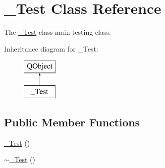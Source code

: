 \hypertarget{class__Test}{}\section{\+\_\+\+Test Class Reference}
\label{class__Test}


The \mbox{\hyperlink{class__Test}{\+\_\+\+Test}} class main testing class.  


Inheritance diagram for \+\_\+\+Test\+:\begin{figure}[H]
\begin{center}
\leavevmode
\includegraphics[height=2.000000cm]{class__Test}
\end{center}
\end{figure}
\subsection*{Public Member Functions}
\begin{DoxyCompactItemize}
\item 
\mbox{\hyperlink{class__Test_a03ecfe4fd048c42338c5c54f73d830e2}{\+\_\+\+Test}} ()
\item 
\mbox{\hyperlink{class__Test_ac861d8bc0d139b86c2f30528d8c1bbbc}{$\sim$\+\_\+\+Test}} ()
\end{DoxyCompactItemize}
